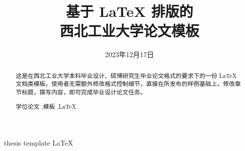 \documentclass[lang=chs, degree=phd, blindreview=false, winfonts=true]{yanputhesis}
\title{基于 LaTeX 排版的 \\ 西北工业大学论文模板}{          %
    Yet Another Thesis Template of \\ Northwestern Polytechnical University
}                                                           %
\author{\blindreview{张三丰}}{\blindreview{Sanfeng Zhang}}  %
\date{2023年12月17日}{November 17, 2023}
\begin{document}
\frontmatter                                                %
\maketitle                                                  %
\begin{abstract}                                            %
    这是在西北工业大学本科毕业设计、硕博研究生毕业论文格式的要求下的一份 LaTeX
    文档类模板。使用者无需额外修改格式控制细节，直接在所发布的样例基础上，修改章
    节标题，撰写内容，即可完成毕业设计论文任务。            %
    \begin{keywords}                                        %
        学位论文 \sep 模板 \sep \LaTeX                      %
    \end{keywords}                                          %
\end{abstract}                                              %
\begin{engabstract}                                         %
    \noindent \blindtext                                    %
    \begin{engkeywords}                                     %
        thesis \ensep template \ensep \LaTeX                %
    \end{engkeywords}                                       %
\end{engabstract}                                           %
\tableofcontents                                            %
\listoffigures                                              %
\listoftables                                               %
\printnomenclature                                          %
\mainmatter
\sDefault
\end{document}
